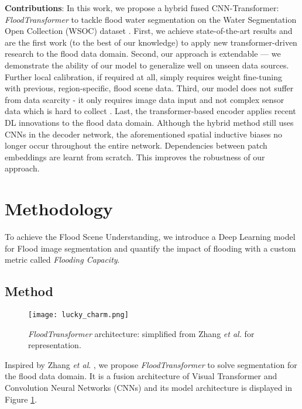 \documentclass{article}
\begin{document}
\textbf{Contributions}: In this work, we propose a hybrid fused CNN-Transformer: \textit{FloodTransformer} to tackle flood water segmentation on the Water Segmentation Open Collection (WSOC) dataset \cite{wsoc}. First, we achieve state-of-the-art results and are the first work (to the best of our knowledge) to apply new transformer-driven research to the flood data domain. Second, our approach is extendable — we demonstrate the ability of our model to generalize well on unseen data sources. Further local calibration, if required at all, simply requires weight fine-tuning with previous, region-specific, flood scene data. Third, our model does not suffer from data scarcity - it only requires image data input and not complex sensor data which is hard to collect \cite{forecasting}. Last, the transformer-based encoder applies recent DL innovations to the flood data domain. Although the hybrid method still uses CNNs in the decoder network, the aforementioned spatial inductive biases no longer occur throughout the entire network. Dependencies between patch embeddings are learnt from scratch. This improves the robustness of our approach. 

\section{Methodology}
To achieve the Flood Scene Understanding, we introduce a Deep Learning model for Flood image segmentation and quantify the impact of flooding with a custom metric called \textit{Flooding Capacity}.
\label{gen_inst}


\subsection{Method}
\label{method}
\begin{figure}[h]
    \centering
    {{\texttt{[image: lucky\_charm.png]}}}\enskip
    \caption{\textit{FloodTransformer} architecture: simplified from Zhang \textit{et al.} \cite{zhang2021transfuse} for representation.}\label{fig:model-architecture}\end{figure}

Inspired by Zhang \textit{et al}. \cite{zhang2021transfuse}, we propose \textit{FloodTransformer} to solve segmentation for the flood data domain. It is a fusion architecture of Visual Transformer \cite{zhou2021deepvit} and Convolution Neural Networks (CNNs) and its model architecture is displayed in Figure \ref{fig:model-architecture}.  
\end{document}
